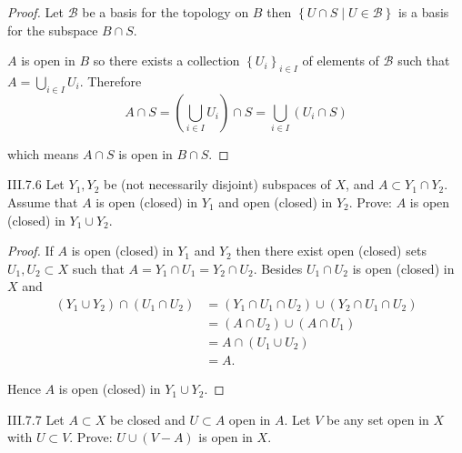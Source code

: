 \begin{proof}
    Let \( \mathscr{B} \) be a basis for the topology on \(B\) then \( \left\{ U \cap S \mid U \in \mathscr{B} \right\} \) is a basis for the subspace \( B \cap S \).

    \( A \) is open in \( B \) so there exists a collection \( {\left\{ U_{i} \right\}}_{i\in I} \) of elements of \( \mathscr{B} \) such that \( A = \bigcup_{i\in I} U_{i} \). Therefore
    \[
        A \cap S = \left(\bigcup_{i\in I} U_{i}\right) \cap S = \bigcup_{i\in I} (U_{i} \cap S)
    \]

    which means \( A \cap S \) is open in \( B \cap S \).
\end{proof}

\begin{problem}{III.7.6}
Let \( Y_{1}, Y_{2} \) be (not necessarily disjoint) subspaces of \(X\), and \( A \subset Y_{1} \cap Y_{2} \). Assume that \( A \) is open (closed) in \(Y_{1}\) and open (closed) in \(Y_{2}\). Prove: \( A \) is open (closed) in \( Y_{1} \cup Y_{2} \).
\end{problem}

\begin{proof}
    If \( A \) is open (closed) in \( Y_{1} \) and \( Y_{2} \) then there exist open (closed) sets \( U_{1}, U_{2} \subset X \) such that \( A = Y_{1} \cap U_{1} = Y_{2} \cap U_{2} \). Besides \( U_{1} \cap U_{2} \) is open (closed) in \(X\) and
    \begingroup
    \allowdisplaybreaks%
    \begin{align*}
        (Y_{1} \cup Y_{2}) \cap (U_{1} \cap U_{2}) & = (Y_{1} \cap U_{1} \cap U_{2}) \cup (Y_{2} \cap U_{1} \cap U_{2}) \\
                                                   & = (A \cap U_{2}) \cup (A \cap U_{1})                               \\
                                                   & = A \cap (U_{1} \cup U_{2})                                        \\
                                                   & = A.
    \end{align*}
    \endgroup

    Hence \( A \) is open (closed) in \( Y_{1} \cup Y_{2} \).
\end{proof}

\begin{problem}{III.7.7}
Let \(A \subset X\) be closed and \( U \subset A \) open in \(A\). Let \(V\) be any set open in \(X\) with \( U \subset V \). Prove: \( U \cup (V - A) \) is open in \(X\).
\end{problem}

